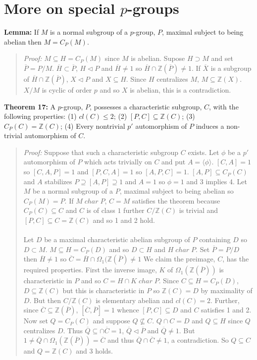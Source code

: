 \section{More on special $p$-groups}
{\bf Lemma:}
If $M$ is a normal subgroup of a $p$-group, $P$, maximal subject to being
abelian then $M= C_P(M)$.
\begin{quote}
\emph{Proof:}  
$M \subseteq H = C_P(M)$ since $M$ is abelian.  Supose $H \supset M$ and set
${\overline P}= P/M$.  ${\overline H} \subset {\overline P}$, $H \lhd P$ and
${\overline H} \ne 1$ so ${\overline H} \cap {\mathbb Z}({\overline P}) \ne 1$.
If ${\overline X}$ is a subgroup of ${\overline H} \cap {\mathbb Z}({\overline P})$,
$X \lhd P$ and $X \subseteq H$.  Since $H$ centralizes $M$, $M \subseteq {\mathbb Z}( X)$.
$X/M$ is cyclic of order $p$ and so $X$ is abelian, this is a contradiction.
\end{quote}
{\bf Theorem 17:}
A $p$-group, $P$, possesses a characteristic subgroup, $C$, with the following properties:
(1) $cl(C) \le 2$;
(2) $[P, C] \subseteq {\mathbb Z}(C)$;
(3) $C_P(C)= {\mathbb Z}(C)$;
(4) Every nontrivial $p'$ automorphism of $P$ induces a non-trivial
automorphism of $C$.
\begin{quote}
\emph{Proof:}  
Suppose that such a characteristic subgroup $C$ exists.  Let $\phi$ be a $p'$ automorphism
of $P$ which acts trivially on  $C$ and put $A= \langle \phi \rangle$.
$[C, A] = 1$ so $[C, A, P] =1$ and $[P, C, A]= 1$ so
$[A, P, C] = 1$.  $[A,P] \subseteq C_P(C)$ and $A$ stabilizes
$P \supseteq [A, P] \supseteq 1$ and $A = 1$ so $\phi= 1$ and 3 implies 4.
Let $M$ 
be a normal subgroup of a $P$, maximal subject to being abelian so $C_P(M)=P$.
If $M \; char \; P$, $C= M$ satisfies the theorem because $C_P(C) \subseteq C$ and
$C$ is of class $1$ further $C/{\mathbb Z}(C)$ is trivial and $[P,C] \subseteq C = {\mathbb Z}(C)$
and so 1 and 2 hold.
\\
\\
Let $D$ be a maximal characteristic abelian subgroup of $P$ containing $D$ so $D \subset M$.
$M \subseteq H=C_P(D)$ and so $D \subset H$ and $H \; char \; P$.  Set ${\overline P}= P/D$
then ${\overline H} \ne 1$ so 
${\overline C} = {\overline H} \cap \Omega_1({\mathbb Z}({\overline P}) \ne 1$
We claim the preimage, $C$, has the required properties.  First the inverse image,
$K$ of $\Omega_1({\mathbb Z}({\overline P}))$ is characteristic in $P$ and so
$C = H \cap K \; char \; P$.  Since $C \subseteq H= C_P(D)$, $D \subseteq {\mathbb Z}(C)$ but
this is characteristic in $P$ so ${\mathbb Z}(C)=D$ by maximality of $D$.
But then $C/{\mathbb Z}(C)$ is elementary abelian and $cl(C)=2$.  Further,
since ${\overline C} \subseteq {\mathbb Z}({\overline P})$, $[{\overline C}, {\overline P}]= 1$
whence $[P, C] \subseteq D$ and $C$ satisfies 1 and 2.
Now set $Q= C_P(C)$ and suppose $Q \nsubseteq C$.  $Q \cap C = D$ and $Q \subseteq H$ since
$Q$ centralizes $D$.  Thus
${\overline Q} \subseteq \cap {\overline C} = 1$, ${\overline Q} \lhd {\overline P}$ and
${\overline Q} \ne 1$.  
But $1 \ne {\overline Q} \cap \Omega_1({\mathbb Z}({\overline P}))= {\overline C}$ and thus
${\overline Q} \cap {\overline C} \ne 1$, a contradiction.  So $Q \subseteq C$ and 
$Q= {\mathbb Z}(C)$ and 3 holds.
\end{quote}
